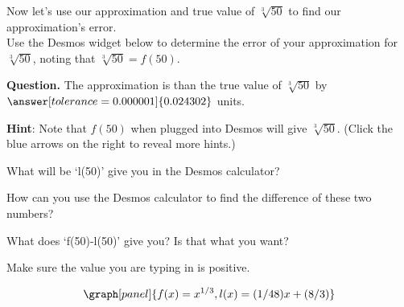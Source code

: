 \documentclass[handout,nooutcomes]{ximera}
\begin{document}
\begin{example}
\begin{explanation}
\begin{image}
\end{image}

Now let's use our approximation and true value of $\sqrt[3]{50}$ to
find our approximation's error.\\


Use the Desmos widget below to determine the error of your approximation for $\sqrt[3]{50}$, noting that $\sqrt[3]{50} = f(50)$.

\textbf{Question. } The approximation is 
than the true value of $\sqrt[3]{50}$ by $\answer[tolerance=0.000001]{0.024302}$ units.\\

\bigskip

\textbf{Hint}: Note that $f(50)$ when plugged into Desmos will give $\sqrt[3]{50}$.
(Click the blue arrows on the right to reveal more hints.)

\begin{expandable}
What will be `l(50)' give you in the Desmos calculator?
\end{expandable}
\begin{expandable}
How can you use the Desmos calculator to find the difference of these two numbers?
\end{expandable}
\begin{expandable}
What does `f(50)-l(50)' give you? Is that what you want?
\end{expandable}
\begin{expandable}
Make sure the value you are typing in is positive.
\end{expandable}


\[
\graph[panel]{f(x) = x^{1/3}, l(x) = (1/48) x + (8/3)}
\]


\end{explanation}
\end{example}
\end{document}
